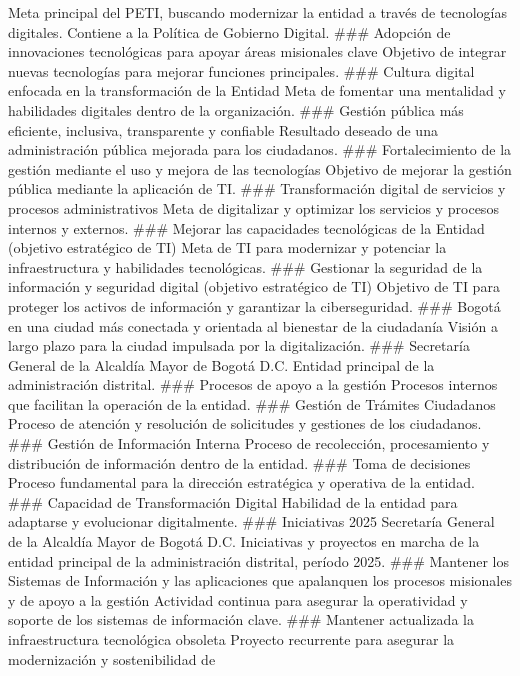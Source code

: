 \documentclass[
	a4paper, %
	12pt, %
]{include/CSSullivanBusinessReport}
\begin{document}
Meta principal del PETI, buscando modernizar la entidad a través de
tecnologías digitales. Contiene a la Política de Gobierno Digital.
\#\#\# Adopción de innovaciones tecnológicas para apoyar áreas
misionales clave Objetivo de integrar nuevas tecnologías para mejorar
funciones principales. \#\#\# Cultura digital enfocada en la
transformación de la Entidad Meta de fomentar una mentalidad y
habilidades digitales dentro de la organización. \#\#\# Gestión pública
más eficiente, inclusiva, transparente y confiable Resultado deseado de
una administración pública mejorada para los ciudadanos. \#\#\#
Fortalecimiento de la gestión mediante el uso y mejora de las
tecnologías Objetivo de mejorar la gestión pública mediante la
aplicación de TI. \#\#\# Transformación digital de servicios y procesos
administrativos Meta de digitalizar y optimizar los servicios y procesos
internos y externos. \#\#\# Mejorar las capacidades tecnológicas de la
Entidad (objetivo estratégico de TI) Meta de TI para modernizar y
potenciar la infraestructura y habilidades tecnológicas. \#\#\#
Gestionar la seguridad de la información y seguridad digital (objetivo
estratégico de TI) Objetivo de TI para proteger los activos de
información y garantizar la ciberseguridad. \#\#\# Bogotá en una ciudad
más conectada y orientada al bienestar de la ciudadanía Visión a largo
plazo para la ciudad impulsada por la digitalización. \#\#\# Secretaría
General de la Alcaldía Mayor de Bogotá D.C. Entidad principal de la
administración distrital. \#\#\# Procesos de apoyo a la gestión Procesos
internos que facilitan la operación de la entidad. \#\#\# Gestión de
Trámites Ciudadanos Proceso de atención y resolución de solicitudes y
gestiones de los ciudadanos. \#\#\# Gestión de Información Interna
Proceso de recolección, procesamiento y distribución de información
dentro de la entidad. \#\#\# Toma de decisiones Proceso fundamental para
la dirección estratégica y operativa de la entidad. \#\#\# Capacidad de
Transformación Digital Habilidad de la entidad para adaptarse y
evolucionar digitalmente. \#\#\# Iniciativas 2025 Secretaría General de
la Alcaldía Mayor de Bogotá D.C. Iniciativas y proyectos en marcha de la
entidad principal de la administración distrital, período 2025. \#\#\#
Mantener los Sistemas de Información y las aplicaciones que apalanquen
los procesos misionales y de apoyo a la gestión Actividad continua para
asegurar la operatividad y soporte de los sistemas de información clave.
\#\#\# Mantener actualizada la infraestructura tecnológica obsoleta
Proyecto recurrente para asegurar la modernización y sostenibilidad de
\end{document}

